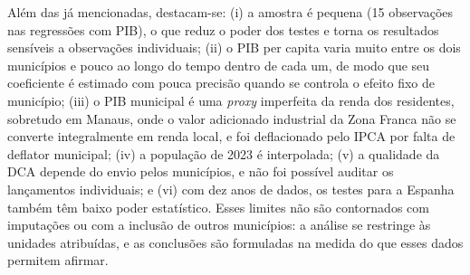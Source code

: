 Além das já mencionadas, destacam-se: (i) a amostra é pequena (15 observações nas regressões com PIB), o que reduz o poder dos testes e torna os resultados sensíveis a observações individuais; (ii) o PIB per capita varia muito entre os dois municípios e pouco ao longo do tempo dentro de cada um, de modo que seu coeficiente é estimado com pouca precisão quando se controla o efeito fixo de município; (iii) o PIB municipal é uma \textit{proxy} imperfeita da renda dos residentes, sobretudo em Manaus, onde o valor adicionado industrial da Zona Franca não se converte integralmente em renda local, e foi deflacionado pelo IPCA por falta de deflator municipal; (iv) a população de 2023 é interpolada; (v) a qualidade da DCA depende do envio pelos municípios, e não foi possível auditar os lançamentos individuais; e (vi) com dez anos de dados, os testes para a Espanha também têm baixo poder estatístico. Esses limites não são contornados com imputações ou com a inclusão de outros municípios: a análise se restringe às unidades atribuídas, e as conclusões são formuladas na medida do que esses dados permitem afirmar.
